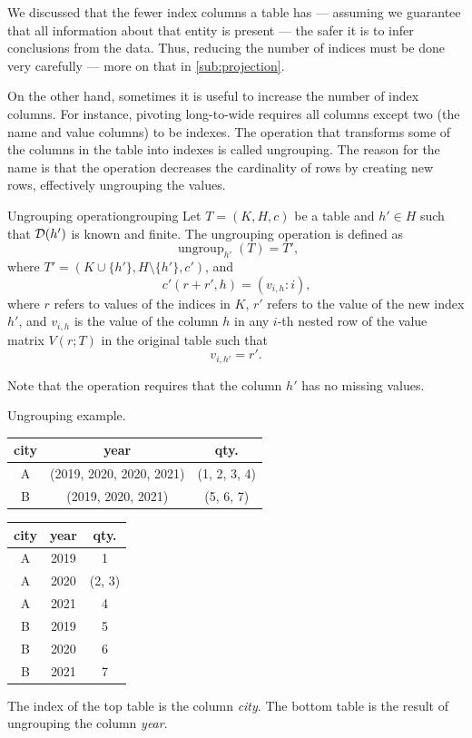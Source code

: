 We discussed that the fewer index columns a table has ---
assuming we guarantee that all information about that entity is present --- the safer
it is to infer conclusions from the data.  Thus, reducing the number of indices
must be done very carefully --- more on that in \cref{sub:projection}.

On the other hand, sometimes it is useful to increase the number of index columns.  For
instance, pivoting long-to-wide requires all columns except two (the name and value
columns) to be indexes.  The
operation that transforms some of the columns in the table into indexes is called ungrouping.
The reason for the name is that the operation decreases the cardinality of rows
by creating new rows, effectively ungrouping the values.

\begin{defbox}{Ungrouping operation}{grouping}
  Let $T = (K, H, c)$ be a table and $h' \in H$ such that $\mathcal{D}\!\left(h'\right)$ is known and
  finite.  The ungrouping operation is defined as \[
    \operatorname{ungroup}_{h'}(T) = T'\text{,}
  \] where $T' = (K \cup \{h'\}, H \setminus \{h'\}, c')$, and \[
    c'(r + r', h) = (v_{i,h} : i)\text{,}
  \] where $r$ refers to values of the indices in $K$, $r'$ refers to the value of the new index
  $h'$, and $v_{i,h}$ is the value of the column $h$ in any $i$-th nested row of the value
  matrix $V(r; T)$ in the original table such that \[
    v_{i, h'} = r'\text{.}
  \]
\end{defbox}

Note that the operation requires that the column $h'$ has no missing values.

\begin{tablebox}[label=tab:ungroup]{Ungrouping example.}
  \centering
  \begin{tabular}{c|cc}
    \toprule
    \textbf{city} & \textbf{year} & \textbf{qty.} \\
    \midrule
    A & (2019, 2020, 2020, 2021) & (1, 2, 3, 4) \\
    B & (2019, 2020, 2021) & (5, 6, 7) \\
    \bottomrule
  \end{tabular}

  \vspace{1em}
  \begin{tabular}{cc|c}
    \toprule
    \textbf{city} & \textbf{year} & \textbf{qty.} \\
    \midrule
    A & 2019 & 1 \\
    A & 2020 & (2, 3) \\
    A & 2021 & 4 \\
    B & 2019 & 5 \\
    B & 2020 & 6 \\
    B & 2021 & 7 \\
    \bottomrule
  \end{tabular}
  \tcblower
  The index of the top table is the column \emph{city}.  The bottom table is the result of
  ungrouping the column \emph{year}.
\end{tablebox}

